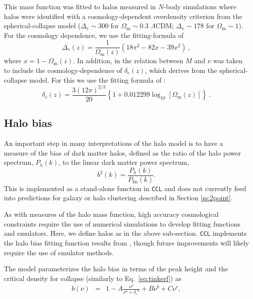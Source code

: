 \documentclass[\docopts]{\docclass}
\newcommand{\ccl}{{\tt CCL}\xspace}
\begin{document}
This mass function was fitted to halos measured in $N$-body simulations where halos were identified with a cosmology-dependent overdensity criterion from the spherical-collapse model ($\Delta_\mathrm{v}\sim 300$ for $\Omega_\mathrm{m}\sim 0.3$ $\Lambda$CDM; $\Delta_\mathrm{v}\sim 178$ for $\Omega_\mathrm{m}\sim 1$). For the cosmology dependence, we use the fitting-formula of \cite{Bryan1998}
\begin{equation}
\Delta_\mathrm{v}(z)=\frac{1}{\Omega_\mathrm{m}(z)}\left(18\pi^2-82x-39x^2\right)\ ,
\label{eq:Deltav_Bryan}
\end{equation}
where $x=1-\Omega_\mathrm{m}(z)$. In addition, in \cite{Sheth1999} the relation between $M$ and $\nu$ was taken to include the cosmology-dependence of $\delta_\mathrm{c}(z)$, which derives from the spherical-collapse model. For this we use the fitting formula of \cite{Nakamura1997}:
\begin{equation}
\delta_\mathrm{c}(z)=\frac{3(12\pi)^{2/3}}{20}\left\{1+0.012299\log_{10}[\Omega_\mathrm{m}(z)]\right\}\ .
\label{eq:deltac_Nakamura}
\end{equation}

\subsection{Halo bias}
\label{sec:hbdef}

An important step in many interpretations of the halo model is to have a measure of the bias of dark matter halos, defined as the ratio of the halo power spectrum, $P_h(k)$, to the linear dark matter power spectrum,
\begin{equation}
  b^2(k) = \frac{P_h(k)}{P_{\mathrm{lin}}(k)}.
  \label{eq:halo_bias}
\end{equation}
This is implemented as a stand-alone function in \ccl and does not currently feed into predictions for galaxy or halo clustering described in Section \ref{ss:2point}.

As with measures of the halo mass function, high accuracy cosmological constraints require the use of numerical simulations to develop fitting functions and emulators. Here, we define halos as in the above sub-section. {\tt CCL} implements the halo bias fitting function results from \citet{Tinker2010}, though future improvements will likely require the use of emulator methods.

The \citet{Tinker2010} model parameterizes the halo bias in terms of the peak height and the critical density for collapse (similarly to Eq.~\ref{eq:tinkerf}) as
\begin{eqnarray}
  b(\nu) &=& 1 - A\frac{\nu^a}{\nu^a + {\delta_c}^a} + B\nu^b+C\nu^c,
\end{eqnarray}
\end{document}
